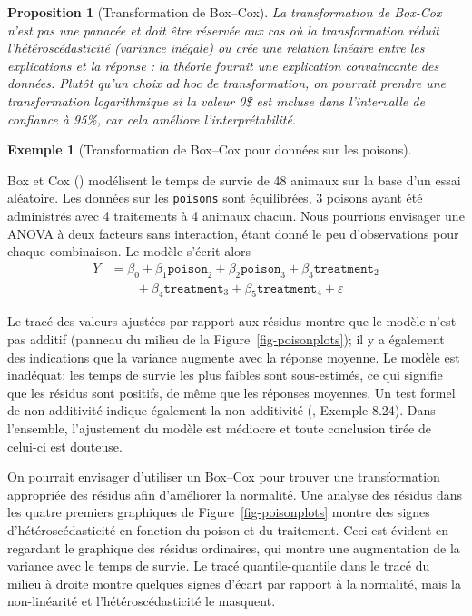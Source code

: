 \documentclass[
  11pt,
  letterpaper,
]{scrbook}
\theoremstyle{plain}
\newtheorem{proposition}{Proposition}[chapter]
\theoremstyle{plain}
\theoremstyle{definition}
\theoremstyle{definition}
\newtheorem{example}{Exemple}[chapter]
\theoremstyle{remark}
\begin{document}
\begin{proposition}[Transformation de
Box--Cox]
La transformation de Box-Cox n'est pas une panacée et doit être réservée
aux cas où la transformation réduit l'hétéroscédasticité (variance
inégale) ou crée une relation linéaire entre les explications et la
réponse : la théorie fournit une explication convaincante des données.
Plutôt qu'un choix \emph{ad hoc} de transformation, on pourrait prendre
une transformation logarithmique si la valeur 0\$ est incluse dans
l'intervalle de confiance à 95\%, car cela améliore l'interprétabilité.

\end{proposition}

\begin{example}[Transformation de Box--Cox pour données sur les
poisons]\protect\hypertarget{exm-poisonboxcox}{}\label{exm-poisonboxcox}

Box et Cox () modélisent le temps de
survie de 48 animaux sur la base d'un essai aléatoire. Les données sur
les \texttt{poisons} sont équilibrées, 3 poisons ayant été administrés
avec 4 traitements à 4 animaux chacun. Nous pourrions envisager une
ANOVA à deux facteurs sans interaction, étant donné le peu
d'observations pour chaque combinaison. Le modèle s'écrit alors
\begin{align*}
Y &= \beta_0 + \beta_1 \texttt{poison}_2 + \beta_2\texttt{poison}_3  +\beta_3\texttt{treatment}_2 \\ &\qquad+ \beta_4\texttt{treatment}_3
+\beta_5\texttt{treatment}_4 + \varepsilon
\end{align*}

Le tracé des valeurs ajustées par rapport aux résidus montre que le
modèle n'est pas additif (panneau du milieu de la
Figure~\ref{fig-poisonplots}); il y a également des indications que la
variance augmente avec la réponse moyenne. Le modèle est inadéquat: les
temps de survie les plus faibles sont sous-estimés, ce qui signifie que
les résidus sont positifs, de même que les réponses moyennes. Un test
formel de non-additivité indique également la non-additivité
(, Exemple 8.24). Dans
l'ensemble, l'ajustement du modèle est médiocre et toute conclusion
tirée de celui-ci est douteuse.

On pourrait envisager d'utiliser un Box--Cox pour trouver une
transformation appropriée des résidus afin d'améliorer la normalité. Une
analyse des résidus dans les quatre premiers graphiques de
Figure~\ref{fig-poisonplots} montre des signes d'hétéroscédasticité en
fonction du poison et du traitement. Ceci est évident en regardant le
graphique des résidus ordinaires, qui montre une augmentation de la
variance avec le temps de survie. Le tracé quantile-quantile dans le
tracé du milieu à droite montre quelques signes d'écart par rapport à la
normalité, mais la non-linéarité et l'hétéroscédasticité le masquent.


\end{example}
\end{document}
